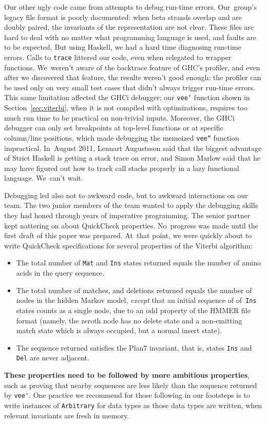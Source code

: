 \documentclass[nonatbib]{sigplanconf}
\newcommand\secref[1]{Section~\ref{sec:#1}}
\begin{document}
Our other ugly code came from  attempts to debug
run-time errors.
Our~group's legacy file
format is poorly documented: when beta
strands overlap and are doubly paired, the invariants of the
representation are not clear.
These files are hard to deal with no matter what
programming language is used, and faults are to be expected.
But using Haskell, we had a hard time diagnosing run-time errors.
Calls to
\texttt{trace} 
littered our code,
even when relegated to wrapper functions.
We~weren't aware of the backtrace feature of GHC's profiler,
and even after we discovered that feature, the results weren't good enough:
the profiler can be used only on very small test cases that didn't always trigger
run-time errors.
This same limitation affected the GHCi debugger; our \texttt{vee'} function
shown in \secref{viterbi}, when it is not compiled with
optimizations, requires too much run time to be practical on non-trivial
inputs.
Moreover, the GHCi debugger can only set breakpoints at top-level functions
or at specific column/line positions, which made debugging the memoized
\texttt{vee''} function impractical.
In~August 2011, 
Lennart Augustsson said that the biggest advantage of Strict
Haskell is getting a stack trace on error,
and Simon Marlow said that he may have figured out how to track call
stacks properly in a lazy functional language.
We~can't wait.


Debugging led also not to awkward code, but to awkward interactions on
our team.
The two junior members of the team wanted to apply the debugging
skills they had honed through years of imperative programming.
The senior partner kept nattering on about QuickCheck properties.
No~progress was made until the first draft of this paper was prepared.
At~that point, we were quickly about to write QuickCheck
specifications for several properties of the Viterbi algorithm:
\begin{itemize}
\item
The total number of \verb+Mat+ and \verb+Ins+ states returned equals
the number of amino acids in the query sequence.
\item
The total number of matches, and deletions returned equals the
number of nodes in the hidden Markov model,
\emph{except} that an initial sequence of
of~\verb+Ins+ states counts as a single node,
due to an odd property of the HMMER file format (namely, the zeroth
node has no delete state and a non-emitting match state which
is always occupied, but a normal insert state).
\item
The sequence returned satisfies the Plan7 invariant, that is, states
\verb+Ins+ and \verb+Del+ are never adjacent.
\end{itemize}
\textbf{These properties need to be followed by more ambitious
properties},
such as proving that nearby sequences are less likely than the
sequence returned by \verb+vee'+.
One practice we recommend for those following in our footsteps is to
write instances of \texttt{Arbitrary} for data types as those data types
are written, when relevant invariants are fresh in memory.
\end{document}
